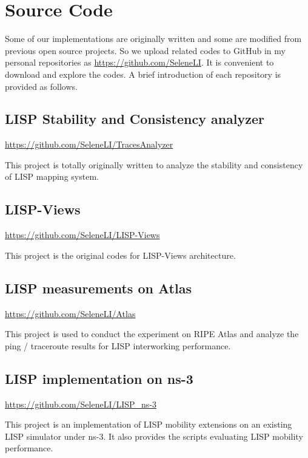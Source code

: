\chapter{Source Code} 
Some of our implementations are originally written and some are modified from previous open source projects. So we upload related codes to GitHub in my personal repositories as \url{https://github.com/SeleneLI}. It is convenient to download and explore the codes. A brief introduction of each repository is provided as follows.


\section{LISP Stability and Consistency analyzer}
\url{https://github.com/SeleneLI/TracesAnalyzer}

This project is totally originally written to analyze the stability and consistency of LISP mapping system.


\section{LISP-Views}
\url{https://github.com/SeleneLI/LISP-Views}

This project is the original codes for LISP-Views architecture.


\section{LISP measurements on Atlas}
\url{https://github.com/SeleneLI/Atlas}

This project is used to conduct the experiment on RIPE Atlas and analyze the ping / traceroute results for LISP interworking performance. 


\section{LISP implementation on ns-3}
\url{https://github.com/SeleneLI/LISP_ns-3}

This project is an implementation of LISP mobility extensions on an existing LISP simulator under ns-3. It also provides the scripts evaluating LISP mobility performance.





